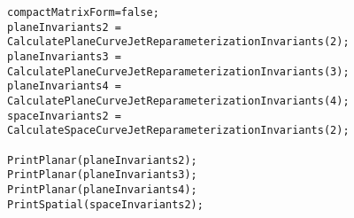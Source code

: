 \documentclass[12pt]{article}
\numberwithin{equation}{section}
\theoremstyle{plain}
\theoremstyle{definition}
\begin{document}
\begin{lstlisting}
compactMatrixForm=false;
planeInvariants2 = CalculatePlaneCurveJetReparameterizationInvariants(2);
planeInvariants3 = CalculatePlaneCurveJetReparameterizationInvariants(3);
planeInvariants4 = CalculatePlaneCurveJetReparameterizationInvariants(4);
spaceInvariants2 = CalculateSpaceCurveJetReparameterizationInvariants(2);

PrintPlanar(planeInvariants2);
PrintPlanar(planeInvariants3);
PrintPlanar(planeInvariants4);
PrintSpatial(spaceInvariants2);
\end{lstlisting}

\nocite{*}


\end{document}
